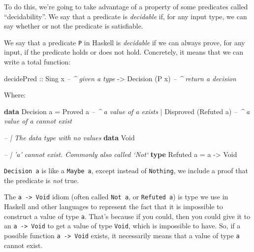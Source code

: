 \documentclass[]{article}
\newenvironment{Shaded}{}{}
\newcommand{\CommentTok}[1]{\textcolor[rgb]{0.38,0.63,0.69}{\textit{#1}}}
\newcommand{\DataTypeTok}[1]{\textcolor[rgb]{0.56,0.13,0.00}{#1}}
\newcommand{\FunctionTok}[1]{\textcolor[rgb]{0.02,0.16,0.49}{#1}}
\newcommand{\KeywordTok}[1]{\textcolor[rgb]{0.00,0.44,0.13}{\textbf{#1}}}
\newcommand{\NormalTok}[1]{#1}
\newcommand{\OtherTok}[1]{\textcolor[rgb]{0.00,0.44,0.13}{#1}}
\begin{document}
To do this, we're going to take advantage of a property of some predicates
called ``decidability''. We say that a predicate is \emph{decidable} if, for any
input type, we can say whether or not the predicate is satisfiable.

We say that a predicate \texttt{P} in Haskell is \emph{decidable} if we can
always prove, for any input, if the predicate holds or does not hold.
Concretely, it means that we can write a total function:

\begin{Shaded}
\begin{Highlighting}[]
\NormalTok{decidePred}
\OtherTok{    ::} \DataTypeTok{Sing}\NormalTok{ x               }\CommentTok{-- ^ given a type}
    \OtherTok{->} \DataTypeTok{Decision}\NormalTok{ (}\DataTypeTok{P}\NormalTok{ x)       }\CommentTok{-- ^ return a decision}
\end{Highlighting}
\end{Shaded}

Where:

\begin{Shaded}
\begin{Highlighting}[]
\KeywordTok{data} \DataTypeTok{Decision}\NormalTok{ a }\FunctionTok{=} \DataTypeTok{Proved}\NormalTok{ a                  }\CommentTok{-- ^ a value of a exists}
                \FunctionTok{|} \DataTypeTok{Disproved}\NormalTok{ (}\DataTypeTok{Refuted}\NormalTok{ a)     }\CommentTok{-- ^ a value of a cannot exist}

\CommentTok{-- | The data type with no values}
\KeywordTok{data} \DataTypeTok{Void}

\CommentTok{-- | 'a' cannot exist.  Commonly also called `Not`}
\KeywordTok{type} \DataTypeTok{Refuted}\NormalTok{ a }\FunctionTok{=}\NormalTok{ a }\OtherTok{->} \DataTypeTok{Void}
\end{Highlighting}
\end{Shaded}

\texttt{Decision\ a} is like a \texttt{Maybe\ a}, except instead of
\texttt{Nothing}, we include a proof that the predicate is \emph{not} true.

The \texttt{a\ -\textgreater{}\ Void} idiom (often called \texttt{Not\ a}, or
\texttt{Refuted\ a}) is type we use in Haskell and other languages to represent
the fact that it is impossible to construct a value of type \texttt{a}. That's
because if you could, then you could give it to an
\texttt{a\ -\textgreater{}\ Void} to get a value of type \texttt{Void}, which is
impossible to have. So, if a possible function \texttt{a\ -\textgreater{}\ Void}
exists, it necessarily means that a value of type \texttt{a} cannot exist.
\end{document}
